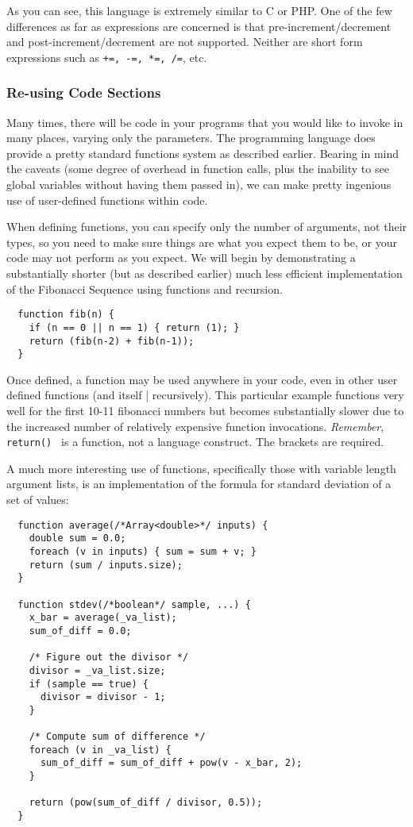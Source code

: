 As you can see, this language is extremely similar to C or PHP. One of the
few differences as far as expressions are concerned is that pre-increment/decrement
and post-increment/decrement are not supported. Neither are short form expressions such
as {\tt +=, -=, *=, /=}, etc.

\subsubsection{Re-using Code Sections}

Many times, there will be code in your \ModLang programs that you would like to invoke
in many places, varying only the parameters. The \ModLang programming language does
provide a pretty standard functions system as described earlier. Bearing in mind the
caveats (some degree of overhead in function calls, plus the inability to see
global variables without having them passed in), we can make pretty ingenious use
of user-defined functions within \ModLang code.

When defining functions, you can specify only the number of arguments, not their
types, so you need to make sure things are what you expect them to be, or your
code may not perform as you expect. We will begin by demonstrating a substantially
shorter (but as described earlier) much less efficient implementation of the
Fibonacci Sequence using functions and recursion.

\lstset{language=LQX}
\begin{lstlisting}
  function fib(n) {
    if (n == 0 || n == 1) { return (1); }
    return (fib(n-2) + fib(n-1));
  }
\end{lstlisting}

Once defined, a function may be used anywhere in your code, even in other user
defined functions (and itself | recursively). This particular example functions
very well for the first 10-11 fibonacci numbers but becomes substantially slower
due to the increased number of relatively expensive function invocations.
\emph{Remember}, {\tt return() } is a function, not a language construct.
The brackets are required.

A much more interesting use of functions, specifically those with variable
length argument lists, is an implementation of the formula for standard deviation
of a set of values:

\lstset{language=LQX}
\begin{lstlisting}
  function average(/*Array<double>*/ inputs) {
    double sum = 0.0;
    foreach (v in inputs) { sum = sum + v; }
    return (sum / inputs.size);
  }

  function stdev(/*boolean*/ sample, ...) {
    x_bar = average(_va_list);
    sum_of_diff = 0.0;

    /* Figure out the divisor */
    divisor = _va_list.size;
    if (sample == true) {
      divisor = divisor - 1;
    }

    /* Compute sum of difference */
    foreach (v in _va_list) {
      sum_of_diff = sum_of_diff + pow(v - x_bar, 2);
    }

    return (pow(sum_of_diff / divisor, 0.5));
  }
\end{lstlisting}

